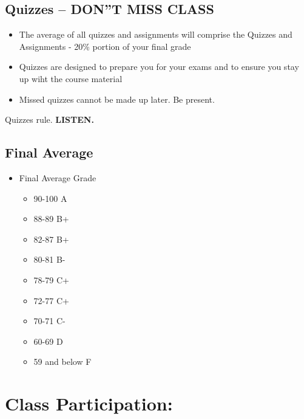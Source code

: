 \documentclass[
]{book}
\providecommand{\tightlist}{%
  \setlength{\itemsep}{0pt}\setlength{\parskip}{0pt}}
\begin{document}
\hypertarget{quizzes-dont-miss-class}{%
\subsection{\texorpdfstring{Quizzes -- \textbf{DON''T MISS CLASS}}{Quizzes -- DON''T MISS CLASS}}\label{quizzes-dont-miss-class}}

\begin{itemize}
\tightlist
\item
  The average of all quizzes and assignments will comprise the Quizzes and Assignments - 20\% portion of your final grade
\item
  Quizzes are designed to prepare you for your exams and to ensure you stay up wiht the course material
\item
  Missed quizzes cannot be made up later. Be present.
\end{itemize}

Quizzes rule. \textbf{LISTEN.}

\hypertarget{final-average}{%
\subsection{Final Average}\label{final-average}}

\begin{itemize}
\tightlist
\item
  Final Average Grade

  \begin{itemize}
  \tightlist
  \item
    90-100 A
  \item
    88-89 B+
  \item
    82-87 B+
  \item
    80-81 B-
  \item
    78-79 C+
  \item
    72-77 C+
  \item
    70-71 C-
  \item
    60-69 D
  \item
    59 and below F
  \end{itemize}
\end{itemize}

\hypertarget{class-participation}{%
\section{Class Participation:}\label{class-participation}}
\end{document}
